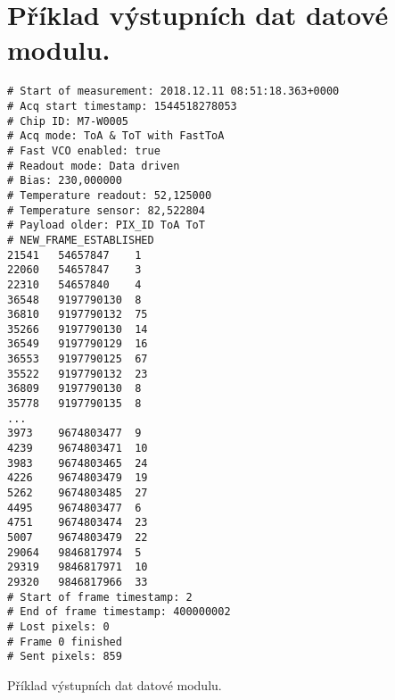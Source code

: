 \section{Příklad výstupních dat datové modulu.}\label{chap:app:katherine:data_example}
\begin{code}[h!]
\begin{verbatim}
# Start of measurement: 2018.12.11 08:51:18.363+0000
# Acq start timestamp: 1544518278053
# Chip ID: M7-W0005
# Acq mode: ToA & ToT with FastToA
# Fast VCO enabled: true
# Readout mode: Data driven
# Bias: 230,000000
# Temperature readout: 52,125000
# Temperature sensor: 82,522804
# Payload older: PIX_ID	ToA	ToT
# NEW_FRAME_ESTABLISHED
21541	54657847	1
22060	54657847	3
22310	54657840	4
36548	9197790130	8
36810	9197790132	75
35266	9197790130	14
36549	9197790129	16
36553	9197790125	67
35522	9197790132	23
36809	9197790130	8
35778	9197790135	8
...
3973	9674803477	9
4239	9674803471	10
3983	9674803465	24
4226	9674803479	19
5262	9674803485	27
4495	9674803477	6
4751	9674803474	23
5007	9674803479	22
29064	9846817974	5
29319	9846817971	10
29320	9846817966	33
# Start of frame timestamp: 2
# End of frame timestamp: 400000002
# Lost pixels: 0
# Frame 0 finished
# Sent pixels: 859

\end{verbatim}
\caption{Příklad výstupních dat datové modulu.}
\end{code}